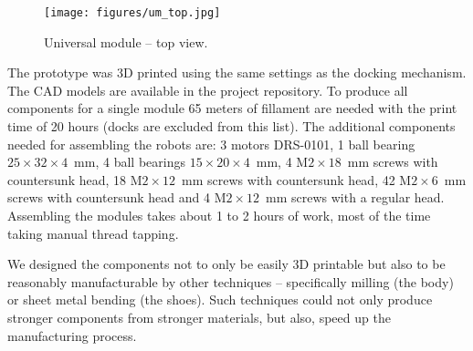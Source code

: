 \begin{figure}[!t]
    \centering
    \texttt{[image: figures/um\_top.jpg]}
    \caption{Universal module -- top view.}
    \label{fig:um_photo_top}
\end{figure}

The prototype was 3D printed using the same settings as the docking mechanism.
The CAD models are available in the project repository. To produce all
components for a single module 65 meters of fillament are needed with the print
time of 20 hours (docks are excluded from this list). The additional components
needed for assembling the robots are: 3 motors DRS-0101, 1 ball bearing
$25\times32\times4$~mm, 4 ball bearings $15\times20\times4$~mm, 4
M$2\times18$~mm screws with countersunk head, 18 M$2\times12$~mm screws with
countersunk head, 42 M$2\times6$~mm screws with countersunk head and 4
M$2\times12$~mm screws with a regular head. Assembling the modules takes about 1
to 2 hours of work, most of the time taking manual thread tapping.

We designed the components not to only be easily 3D printable but also to be
reasonably manufacturable by other techniques -- specifically milling (the body)
or sheet metal bending (the shoes). Such techniques could not only produce
stronger components from stronger materials, but also, speed up the
manufacturing process.
